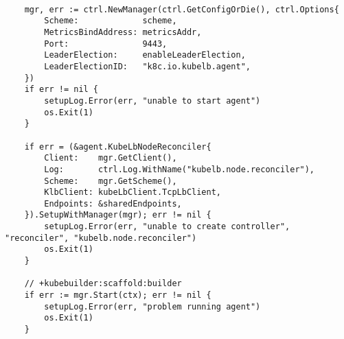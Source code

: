 \begin{lstlisting}[caption={KubeLB Agent main.go snippet - Manager and Controller}, label={lst:main-manager}]

	mgr, err := ctrl.NewManager(ctrl.GetConfigOrDie(), ctrl.Options{
		Scheme:             scheme,
		MetricsBindAddress: metricsAddr,
		Port:               9443,
		LeaderElection:     enableLeaderElection,
		LeaderElectionID:   "k8c.io.kubelb.agent",
	})
	if err != nil {
		setupLog.Error(err, "unable to start agent")
		os.Exit(1)
	}

	if err = (&agent.KubeLbNodeReconciler{
		Client:    mgr.GetClient(),
		Log:       ctrl.Log.WithName("kubelb.node.reconciler"),
		Scheme:    mgr.GetScheme(),
		KlbClient: kubeLbClient.TcpLbClient,
		Endpoints: &sharedEndpoints,
	}).SetupWithManager(mgr); err != nil {
		setupLog.Error(err, "unable to create controller", "reconciler", "kubelb.node.reconciler")
		os.Exit(1)
	}

	// +kubebuilder:scaffold:builder
	if err := mgr.Start(ctx); err != nil {
		setupLog.Error(err, "problem running agent")
		os.Exit(1)
	}


\end{lstlisting}

